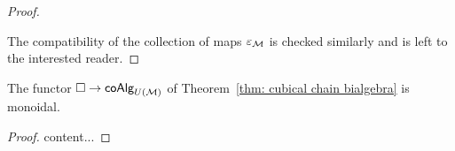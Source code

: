 \begin{proof}
\begin{center}
\begin{tikzcd}
		\end{tikzcd}
		\qquad
	\end{center}
	The compatibility of the collection of maps $\varepsilon_\M$ is checked similarly and is left to the interested reader.
\end{proof}

\begin{theorem}
	The functor $\cube \to \coAlg_{U(\M)}$ of Theorem~\ref{thm: cubical chain bialgebra} is monoidal.
\end{theorem}

\begin{proof}
	content...
\end{proof}